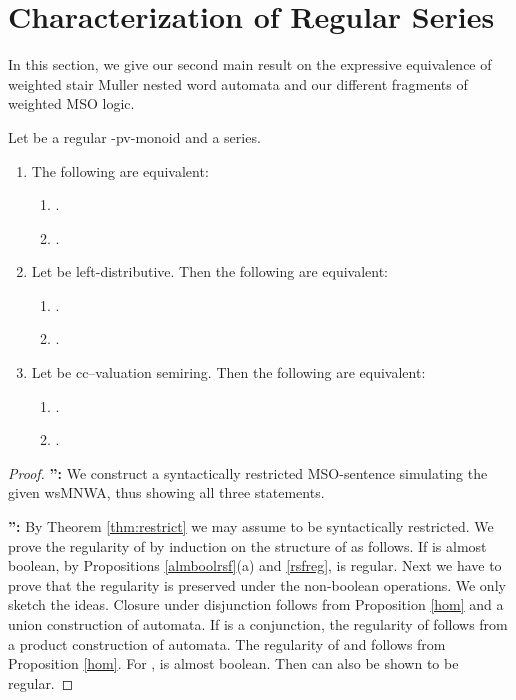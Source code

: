 \documentclass[runningheads, envcountsame, a4paper]{llncs}
\begin{document}
\section{Characterization of Regular Series} \label{chapchar}
In this section, we give our second main result on the expressive equivalence of weighted stair Muller nested word automata and our different fragments of weighted MSO logic. 
\begin{Theorem}
\label{main}
	Let  be a regular -pv-monoid and  a series.
	\begin{enumerate}\item 	The following are equivalent:
		\begin{enumerate}\item .
			\item .
		\end{enumerate}
	\item 	Let  be left-distributive. Then the following are equivalent:
		\begin{enumerate}\item .
			\item \forall\wedge.
		\end{enumerate}
	\item 	Let  be cc--valuation semiring. Then the following are equivalent:
		\begin{enumerate}\item .
			\item \forall\wedge.
		\end{enumerate}
	\end{enumerate}
\end{Theorem}
\begin{proof}
\par 
\textbf{'':} We construct a syntactically restricted MSO-sentence simulating the given wsMNWA, thus showing all three statements. 
\par
\textbf{'':} By Theorem \ref{thm:restrict} we may assume  to be syntactically restricted. We prove the regularity of  by induction on the structure of  as follows.
If  is almost boolean, by Propositions \ref{almboolrsf}(a) and \ref{rsfreg},  is regular. Next we have to prove that the regularity is preserved under the non-boolean operations.
We only sketch the ideas. Closure under disjunction follows from Proposition \ref{hom} and a union construction of automata. If  is a conjunction, the regularity of  
follows from a product construction of automata. The regularity of  and  follows from Proposition \ref{hom}. For ,  is almost boolean. Then  can also be shown to be regular. \end{proof} 
\end{document}
